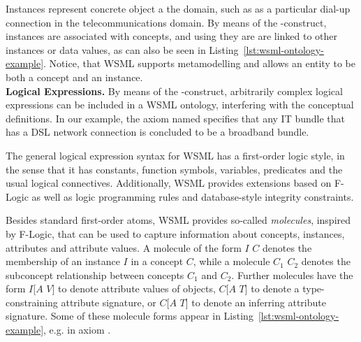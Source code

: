 Instances represent concrete object a the domain, such as
 as a particular dial-up connection in the
telecommunications domain. By means of the
-construct, instances are associated with concepts,
and using  they are are linked to other instances or
data values, as can also be seen in
Listing~\ref{lst:wsml-ontology-example}. Notice, that WSML supports
metamodelling and allows an entity to be both a concept and an
instance.\\[2mm]
{\bfseries Logical Expressions.} By means of the
-construct, arbitrarily complex logical expressions can
be included in a WSML ontology, interfering with the conceptual
definitions. In our example, the axiom named
 specifies that any
IT bundle that has a DSL network connection is concluded to be a
broadband bundle.

The general logical expression syntax for WSML has a first-order
logic style, in the sense that it has constants, function symbols,
variables, predicates and the usual logical connectives.
Additionally, WSML provides extensions based on F-Logic
\cite{Kifer+LausenETAL-LogiFounObjeFram:95} as well as logic
programming rules and database-style integrity constraints.

Besides standard first-order atoms, WSML provides so-called
\emph{molecules}, inspired by F-Logic, that can be used to capture
information about concepts, instances, attributes and attribute
values. A molecule of the form $I$  $C$ denotes the
membership of an instance $I$ in a concept $C$, while a molecule
$C_1$  $C_2$ denotes the subconcept relationship
between concepts $C_1$ and $C_2$. Further molecules have the form
$I$[$A$  $V$] to denote attribute values of objects,
$C$[$A$  $T$] to denote a type-constraining attribute
signature, or $C$[$A$  $T$] to denote an inferring
attribute signature. Some of these molecule forms appear in
Listing~\ref{lst:wsml-ontology-example}, e.g. in axiom
.

